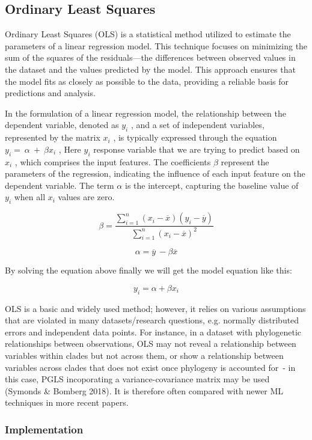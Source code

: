 \subsection{Ordinary Least Squares}
Ordinary Least Squares (OLS) is a
  statistical method utilized to estimate the parameters of a linear
  regression model. This technique focuses on minimizing the sum of the
  squares of the residuals---the differences between observed values in
  the dataset and the values predicted by the model. This approach
  ensures that the model fits as closely as possible to the data,
  providing a reliable basis for predictions and analysis.

In the formulation of a linear regression model, the relationship
between the dependent variable, denoted as \(y_{i}\) ,
and a set of independent variables, represented by the matrix
\(x_{i}\) , is typically expressed through the
equation
\(y_{i}\mathit{= \ }\mathit{\alpha\  + \ }\mathit{\beta}x_{i}\)
, Here \(y_{i}\) response variable that we are trying
to predict based on \(x_{i}\) , which comprises the
input features. The coefficients \(\mathit{\beta}\) represent the
parameters of the regression, indicating the influence of each input
feature on the dependent variable. The term \(\mathit{\alpha}\) is the
intercept, capturing the baseline value of \(y_{i}\)
when all \(x_{i}\) values are zero.

$$
\beta = \frac{\sum_{i = 1}^{n}{(x_{i}-\overline{x})(y_{i}-\overline{y})}}{\sum_{i = 1}^{n}{(x_{i}-\overline{x})}^{2}}
$$

$$
\alpha  = \overline{y}\  - \beta\overline{x}
$$

By solving the equation above finally we will get the model equation
like this:

$$
y_{i}= \alpha  + \beta x_{i}
$$

OLS is a basic and widely used method; however, it relies on various
assumptions that are violated in many datasets/research questions, e.g.
normally distributed errors and independent data points. For instance,
in a dataset with phylogenetic relationships between observations, OLS
may not reveal a relationship between variables within clades but not
across them, or show a relationship between variables across clades that
does not exist once phylogeny is accounted for~- in this case, PGLS
incoporating a variance-covariance matrix may be used (Symonds \&
Bomberg 2018). It is therefore often compared with newer ML techniques
in more recent papers.

\subsubsection{Implementation}

